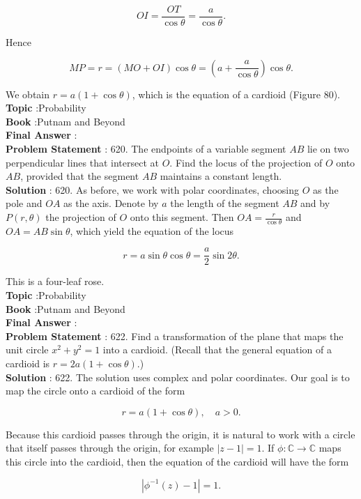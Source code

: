 \documentclass[10pt]{article}
\begin{document}
$$
O I=\frac{O T}{\cos \theta}=\frac{a}{\cos \theta} .
$$

Hence

$$
M P=r=(M O+O I) \cos \theta=\left(a+\frac{a}{\cos \theta}\right) \cos \theta .
$$

We obtain $r=a(1+\cos \theta)$, which is the equation of a cardioid (Figure 80).
\\
\textbf{Topic} :Probability\\
\textbf{Book} :Putnam and Beyond\\
\textbf{Final Answer} :\\


\textbf{Problem Statement} :
620. The endpoints of a variable segment $A B$ lie on two perpendicular lines that intersect at $O$. Find the locus of the projection of $O$ onto $A B$, provided that the segment $A B$ maintains a constant length.
\\
\textbf{Solution} :
620. As before, we work with polar coordinates, choosing $O$ as the pole and $O A$ as the axis. Denote by $a$ the length of the segment $A B$ and by $P(r, \theta)$ the projection of $O$ onto this segment. Then $O A=\frac{r}{\cos \theta}$ and $O A=A B \sin \theta$, which yield the equation of the locus

$$
r=a \sin \theta \cos \theta=\frac{a}{2} \sin 2 \theta .
$$

This is a four-leaf rose.
\\
\textbf{Topic} :Probability\\
\textbf{Book} :Putnam and Beyond\\
\textbf{Final Answer} :\\


\textbf{Problem Statement} :
622. Find a transformation of the plane that maps the unit circle $x^{2}+y^{2}=1$ into a cardioid. (Recall that the general equation of a cardioid is $r=2 a(1+\cos \theta)$.)
\\
\textbf{Solution} :
622. The solution uses complex and polar coordinates. Our goal is to map the circle onto a cardioid of the form

$$
r=a(1+\cos \theta), \quad a>0 .
$$

Because this cardioid passes through the origin, it is natural to work with a circle that itself passes through the origin, for example $|z-1|=1$. If $\phi: \mathbb{C} \rightarrow \mathbb{C}$ maps this circle into the cardioid, then the equation of the cardioid will have the form

$$
\left|\phi^{-1}(z)-1\right|=1 .
$$
\end{document}
